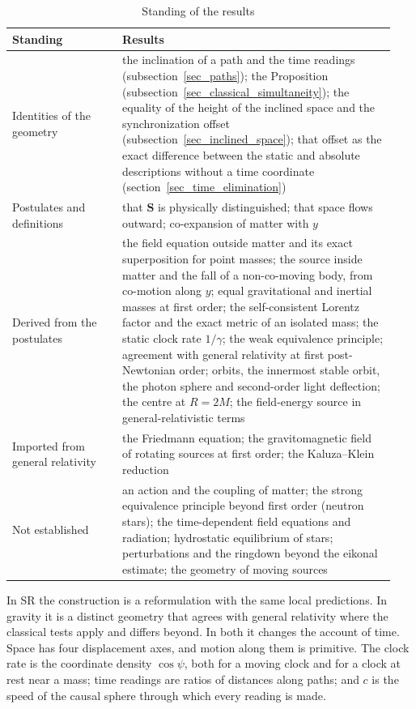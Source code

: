\documentclass{iopjournal}
\begin{document}
\begin{table}[h]
\caption{Standing of the results}%
\label{table_status}
\begin{tabular}{@{}p{0.27\linewidth}p{0.67\linewidth}@{}}
\toprule
Standing & Results\\
\midrule
Identities of the geometry & the inclination of a path and the time readings (subsection~\ref{sec_paths}); the Proposition (subsection~\ref{sec_classical_simultaneity}); the equality of the height of the inclined space and the synchronization offset (subsection~\ref{sec_inclined_space}); that offset as the exact difference between the static and absolute descriptions without a time coordinate (section~\ref{sec_time_elimination})\\
Postulates and definitions & that $\mathbf{S}$ is physically distinguished; that space flows outward; co-expansion of matter with $y$\\
Derived from the postulates & the field equation outside matter and its exact superposition for point masses; the source inside matter and the fall of a non-co-moving body, from co-motion along $y$; equal gravitational and inertial masses at first order; the self-consistent Lorentz factor and the exact metric of an isolated mass; the static clock rate $1/\gamma$; the weak equivalence principle; agreement with general relativity at first post-Newtonian order; orbits, the innermost stable orbit, the photon sphere and second-order light deflection; the centre at $R=2M$; the field-energy source in general-relativistic terms\\
Imported from general relativity & the Friedmann equation; the gravitomagnetic field of rotating sources at first order; the Kaluza--Klein reduction\\
Not established & an action and the coupling of matter; the strong equivalence principle beyond first order (neutron stars); the time-dependent field equations and radiation; hydrostatic equilibrium of stars; perturbations and the ringdown beyond the eikonal estimate; the geometry of moving sources\\
\bottomrule
\end{tabular}
\end{table}

In SR the construction is a reformulation with the same local predictions. In gravity it is a distinct geometry that agrees with general relativity where the classical tests apply and differs beyond. In both it changes the account of time. Space has four displacement axes, and motion along them is primitive. The clock rate is the coordinate density $\cos\psi$, both for a moving clock and for a clock at rest near a mass; time readings are ratios of distances along paths; and $c$ is the speed of the causal sphere through which every reading is made.
\end{document}
